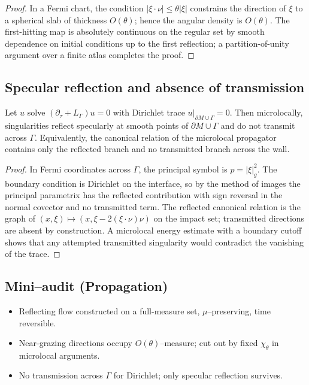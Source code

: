 \begin{proof}
In a Fermi chart, the condition $|\xi\cdot\nu|\le \theta|\xi|$ constrains the direction of $\xi$ to a spherical slab of thickness $O(\theta)$; hence the angular density is $O(\theta)$. The first-hitting map is absolutely continuous on the regular set by smooth dependence on initial conditions up to the first reflection; a partition-of-unity argument over a finite atlas completes the proof.
\end{proof}

\subsection{Specular reflection and absence of transmission}
\begin{proposition}
\label{prop:no-transmission}
Let $u$ solve $(\partial_\tau+L_\Gamma)u=0$ with Dirichlet trace $u|_{\partial M\cup\Gamma}=0$.
Then microlocally, singularities reflect specularly at smooth points of $\partial M\cup\Gamma$ and do not transmit across $\Gamma$. 
Equivalently, the canonical relation of the microlocal propagator contains only the reflected branch and no transmitted branch across the wall.
\end{proposition}

\begin{proof}
In Fermi coordinates across $\Gamma$, the principal symbol is $p=|\xi|_g^2$. The boundary condition is Dirichlet on the interface, so by the method of images the principal parametrix has the reflected contribution with sign reversal in the normal covector and no transmitted term. The reflected canonical relation is the graph of $(x,\xi)\mapsto(x,\xi-2(\xi\cdot\nu)\nu)$ on the impact set; transmitted directions are absent by construction. A microlocal energy estimate with a boundary cutoff shows that any attempted transmitted singularity would contradict the vanishing of the trace.
\end{proof}

\subsection*{Mini–audit (Propagation)}
\begin{itemize}
  \item Reflecting flow constructed on a full-measure set, $\mu$–preserving, time reversible.
  \item Near-grazing directions occupy $O(\theta)$–measure; cut out by fixed $\chi_\theta$ in microlocal arguments.
  \item No transmission across $\Gamma$ for Dirichlet; only specular reflection survives.
\end{itemize}

